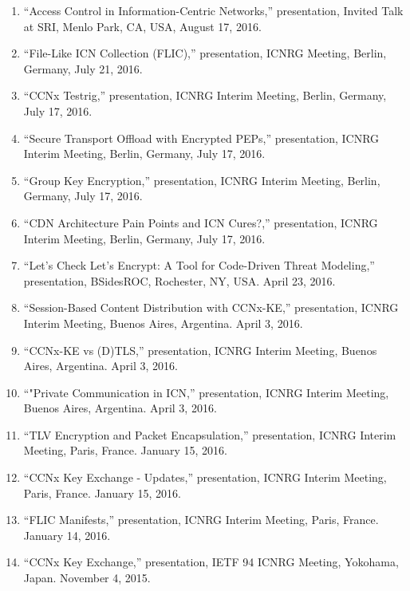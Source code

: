 \documentclass[10pt]{res} %
\begin{document}
\begin{resume}
\begin{enumerate}[T-1.]
\item ``Access Control in Information-Centric Networks,'' presentation, Invited Talk at SRI, Menlo Park, CA, USA, August 17, 2016.

\item ``File-Like ICN Collection (FLIC),'' presentation, ICNRG Meeting, Berlin, Germany, July 21, 2016.

\item ``CCNx Testrig,'' presentation, ICNRG Interim Meeting, Berlin, Germany, July 17, 2016.

\item ``Secure Transport Offload with Encrypted PEPs,'' presentation, ICNRG Interim Meeting, Berlin, Germany, July 17, 2016.

\item ``Group Key Encryption,'' presentation, ICNRG Interim Meeting, Berlin, Germany, July 17, 2016.

\item ``CDN Architecture Pain Points and ICN Cures?,'' presentation, ICNRG Interim Meeting, Berlin, Germany, July 17, 2016.

\item ``Let's Check Let's Encrypt: A Tool for Code-Driven Threat Modeling,'' presentation, BSidesROC, Rochester, NY, USA. April 23, 2016.

\item ``Session-Based Content Distribution with CCNx-KE,'' presentation, ICNRG Interim Meeting, Buenos Aires, Argentina. April 3, 2016.

\item ``CCNx-KE vs (D)TLS,'' presentation, ICNRG Interim Meeting, Buenos Aires, Argentina. April 3, 2016.

\item ``"Private Communication in ICN,'' presentation, ICNRG Interim Meeting, Buenos Aires, Argentina. April 3, 2016.

\item ``TLV Encryption and Packet Encapsulation,'' presentation, ICNRG Interim Meeting, Paris, France. January 15, 2016.

\item ``CCNx Key Exchange - Updates,'' presentation, ICNRG Interim Meeting, Paris, France. January 15, 2016.

\item ``FLIC Manifests,'' presentation, ICNRG Interim Meeting, Paris, France. January 14, 2016.

\item ``CCNx Key Exchange,'' presentation, IETF 94 ICNRG Meeting, Yokohama, Japan. November 4, 2015.


\end{enumerate}
\end{resume}
\end{document}
